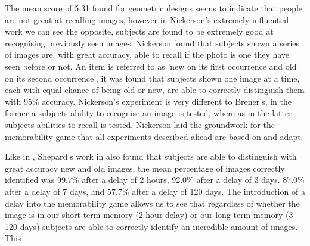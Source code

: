 \documentclass{UoYCSproject}
\begin{document}
% 
The mean score of 5.31 found for geometric designs seems to indicate that people are not great at recalling images, however in Nickerson's extremely influential work \cite{NickersonShortTermMemory} we can see the opposite, subjects are found to be extremely good at recognising previously seen images. Nickerson found that subjects shown a series of images are, with great accuracy, able to recall if the photo is one they have seen before or not. An item is referred to as 'new on its first occurrence and old on its second occurrence'\cite[p.156]{NickersonShortTermMemory}, it was found that subjects shown one image at a time, each with equal chance of being old or new, are able to correctly distinguish them with 95\% accuracy. Nickerson's experiment is very different to Brener's, in the former a subjects ability to recognise an image is tested, where as in the latter subjects abilities to recall is tested. Nickerson laid the groundwork for the memorability game that all experiments described ahead are based on and adapt.  

Like in \cite{NickersonShortTermMemory}, Shepard's work in \cite{ShepardRecognition} also found that subjects are able to distinguish with great accuracy new and old images, the mean percentage of images correctly identified was 99.7\% after a delay of 2 hours, 92.0\% after a delay of 3 days. 87.0\% after a delay of 7 days, and 57.7\% after a delay of 120 days. The introduction of a delay into the memorability game allows us to see that regardless of whether the image is in our short-term memory (2 hour delay) or our long-term memory (3-120 days) subjects are able to correctly identify an incredible amount of images. This 
\end{document}
